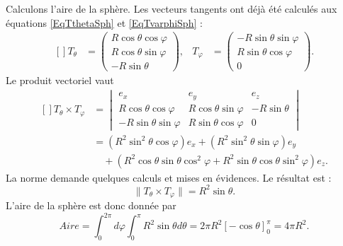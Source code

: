 \begin{example}
	Calculons l'aire de la sphère. Les vecteurs tangents ont déjà été calculés aux équations \eqref{EqTthetaSph} et \eqref{EqTvarphiSph} :
	\begin{equation}
		\begin{aligned}[]
			T_{\theta} & =\begin{pmatrix}
				              R\cos\theta\cos\varphi \\
				              R\cos\theta\sin\varphi \\
				              -R\sin\theta
			              \end{pmatrix},
			           & T_{\varphi}               & =\begin{pmatrix}
				                                          -R\sin\theta\sin\varphi \\
				                                          R\sin\theta\cos\varphi  \\
				                                          0
			                                          \end{pmatrix}.
		\end{aligned}
	\end{equation}
	Le produit vectoriel vaut
	\begin{equation}
		\begin{aligned}[]
			T_{\theta}\times T_{\varphi} & =
			\begin{vmatrix}
				e_x                     & e_y                    & e_z          \\
				R\cos\theta\cos\varphi  & R\cos\theta\sin\varphi & -R\sin\theta \\
				-R\sin\theta\sin\varphi & R\sin\theta\cos\varphi & 0
			\end{vmatrix}                                                        \\
			                             & =(R^2\sin^2\theta\cos\varphi)e_x+(R^2\sin^2\theta\sin\varphi)e_y                        \\
			                             & \quad +(R^2\cos\theta\sin\theta\cos^2\varphi+R^2\sin\theta\cos\theta \sin^2\varphi)e_z.
		\end{aligned}
	\end{equation}
	La norme demande quelques calculs et mises en évidences. Le résultat est :
	\begin{equation}        \label{EqProdVectTTSPh}
		\| T_{\theta}\times T_{\varphi} \|=R^2\sin\theta.
	\end{equation}
	L'aire de la sphère est donc donnée par
	\begin{equation}
		Aire=\int_0^{2\pi}d\varphi\int_0^{\pi} R^2\sin\theta d\theta=2\pi R^2[-\cos\theta]_0^{\pi}=4\pi R^2.
	\end{equation}


\end{example}

